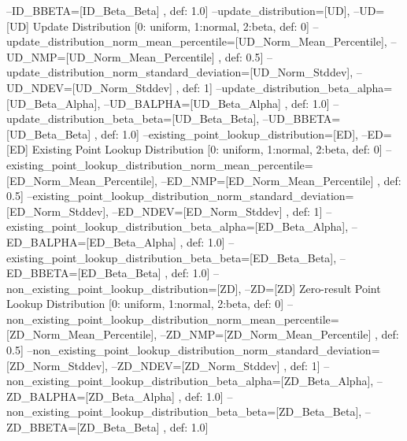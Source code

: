         --ID_BBETA=[ID_Beta_Beta]         , def: 1.0]
        --update_distribution=[UD],
        --UD=[UD]                         Update Distribution [0: uniform,
                                          1:normal, 2:beta, def: 0]
        --update_distribution_norm_mean_percentile=[UD_Norm_Mean_Percentile],
        --UD_NMP=[UD_Norm_Mean_Percentile]
                                          , def: 0.5]
        --update_distribution_norm_standard_deviation=[UD_Norm_Stddev],
        --UD_NDEV=[UD_Norm_Stddev]        , def: 1]
        --update_distribution_beta_alpha=[UD_Beta_Alpha],
        --UD_BALPHA=[UD_Beta_Alpha]       , def: 1.0]
        --update_distribution_beta_beta=[UD_Beta_Beta],
        --UD_BBETA=[UD_Beta_Beta]         , def: 1.0]
        --existing_point_lookup_distribution=[ED],
        --ED=[ED]                         Existing Point Lookup Distribution [0:
                                          uniform, 1:normal, 2:beta, def: 0]
        --existing_point_lookup_distribution_norm_mean_percentile=[ED_Norm_Mean_Percentile],
        --ED_NMP=[ED_Norm_Mean_Percentile]
                                          , def: 0.5]
        --existing_point_lookup_distribution_norm_standard_deviation=[ED_Norm_Stddev],
        --ED_NDEV=[ED_Norm_Stddev]        , def: 1]
        --existing_point_lookup_distribution_beta_alpha=[ED_Beta_Alpha],
        --ED_BALPHA=[ED_Beta_Alpha]       , def: 1.0]
        --existing_point_lookup_distribution_beta_beta=[ED_Beta_Beta],
        --ED_BBETA=[ED_Beta_Beta]         , def: 1.0]
        --non_existing_point_lookup_distribution=[ZD],
        --ZD=[ZD]                         Zero-result Point Lookup Distribution
                                          [0: uniform, 1:normal, 2:beta, def: 0]
        --non_existing_point_lookup_distribution_norm_mean_percentile=[ZD_Norm_Mean_Percentile],
        --ZD_NMP=[ZD_Norm_Mean_Percentile]
                                          , def: 0.5]
        --non_existing_point_lookup_distribution_norm_standard_deviation=[ZD_Norm_Stddev],
        --ZD_NDEV=[ZD_Norm_Stddev]        , def: 1]
        --non_existing_point_lookup_distribution_beta_alpha=[ZD_Beta_Alpha],
        --ZD_BALPHA=[ZD_Beta_Alpha]       , def: 1.0]
        --non_existing_point_lookup_distribution_beta_beta=[ZD_Beta_Beta],
        --ZD_BBETA=[ZD_Beta_Beta]         , def: 1.0]